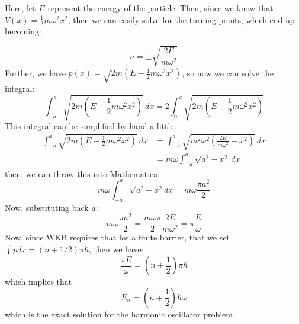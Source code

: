 \documentclass[10pt]{article}
\begin{document}
	\begin{solution}
		Here, let $E$ represent the energy of the particle. Then, since we know that $V(x) = \frac{1}{2}m
		\omega^2 x^2$, then we can easily solve for the turning points, which end up becoming:

			\[
		a = \pm \sqrt{\frac{2E}{m\omega^2}} 
		\] 
		Further, we have $p(x) = \sqrt{2m(E - \frac{1}{2}m \omega^2x^2)}$, so now we can solve the integral:
		\[
			\int_{-a}^a \sqrt{2m(E - \frac{1}{2}m \omega^2x^2)} \ dx  = 2\int_0^a \sqrt{2m(E - \frac{1}{2}m \omega^2 x^2)} 
		\] 
		This integral can be simplified by hand a little:
		\begin{align*}
			\int_{-a}^a \sqrt{2m(E - \frac{1}{2}m \omega^2 x^2)} \ dx &= \int_{-a}^a \sqrt{m^2 \omega^2\left( \frac{2E}{m \omega^2} - x^2 \right) } \ dx\\
			&=  m \omega \int_{-a}^a \sqrt{a^2 - x^2}  \ dx 
		\end{align*}
		then, we can throw this into Mathematica:
		\[
			m\omega \int_{-a}^a \sqrt{a^2 - x^2}  dx = m \omega\frac{\pi a^2}{2}
		\] 
		Now, substituting back $a$:
		\[
		m \omega \frac{\pi a^2}{2} = \frac{m \omega \pi}{2} \frac{2E}{m \omega^2} = \pi \frac{E}{\omega}
		\] 
		Now, since WKB requires that for a finite barrier, that we set $\int p dx = (n + 1/2) \pi \hbar$, then 
		we have: 
		\[
			\frac{\pi E}{\omega} = \left( n + \frac{1}{2} \right) \pi \hbar
		\] 
		which implies that 
		\[
		E_n = \left( n + \frac{1}{2} \right) \hbar \omega
		\] 
		which is the exact solution for the harmonic oscillator problem.
	\end{solution}
	\pagebreak
\end{document}
